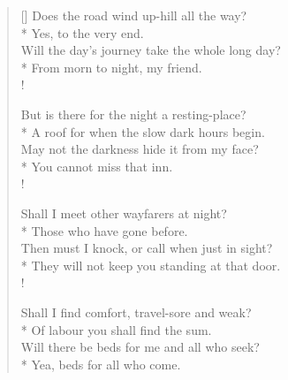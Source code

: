 \documentclass[MAIN]{subfiles}
\begin{document}
\settowidth{\versewidth}{Does the road wind up-hill all the way?}
\begin{verse}[\versewidth]
Does the road wind up-hill all the way?\\*
\vin Yes, to the very end.\\
Will the day's journey take the whole long day?\\*
\vin From morn to night, my friend.\\!

But is there for the night a resting-place?\\*
\vin A roof for when the slow dark hours begin.\\
May not the darkness hide it from my face?\\*
\vin You cannot miss that inn.\\!

Shall I meet other wayfarers at night?\\*
\vin Those who have gone before.\\
Then must I knock, or call when just in sight?\\*
\vin They will not keep you standing at that door.\\!

Shall I find comfort, travel-sore and weak?\\*
\vin Of labour you shall find the sum.\\
Will there be beds for me and all who seek?\\*
\vin Yea, beds for all who come.
\end{verse}
\end{document}
